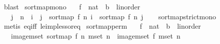 \begin{isabellebody}
\ blast\isanewline
{}\isamarkupfalse%
%
\endisatagproof
{\isafoldproof}%
%
\isadelimproof
\isanewline
%
\endisadelimproof
\isanewline
{}\isamarkupfalse%
\ sort{\isacharunderscore}{\kern0pt}map{\isacharunderscore}{\kern0pt}mono{\isacharcolon}{\kern0pt}\isanewline
\ \ \ f\ {\isacharcolon}{\kern0pt}{\isacharcolon}{\kern0pt}\ {\isachardoublequoteopen}nat\ {\isasymRightarrow}\ {\isacharprime}{\kern0pt}b\ {\isacharcolon}{\kern0pt}{\isacharcolon}{\kern0pt}\ linorder{\isachardoublequoteclose}\isanewline
\ \ \ {\isachardoublequoteopen}j\ {\isacharless}{\kern0pt}\ n\ {\isasymLongrightarrow}\ i\ {\isasymle}\ j\ {\isasymLongrightarrow}\ sort{\isacharunderscore}{\kern0pt}map\ f\ n\ i\ {\isasymle}\ sort{\isacharunderscore}{\kern0pt}map\ f\ n\ j{\isachardoublequoteclose}\isanewline
%
\isadelimproof
\ \ %
\endisadelimproof
%
\isatagproof
{}\isamarkupfalse%
\ sort{\isacharunderscore}{\kern0pt}map{\isacharunderscore}{\kern0pt}strict{\isacharunderscore}{\kern0pt}mono\ \isanewline
\ \ \isamarkupfalse%
\ {\isacharparenleft}{\kern0pt}metis\ eq{\isacharunderscore}{\kern0pt}iff\ le{\isacharunderscore}{\kern0pt}imp{\isacharunderscore}{\kern0pt}less{\isacharunderscore}{\kern0pt}or{\isacharunderscore}{\kern0pt}eq{\isacharparenright}{\kern0pt}%
\endisatagproof
{\isafoldproof}%
%
\isadelimproof
\isanewline
%
\endisadelimproof
\isanewline
{}\isamarkupfalse%
\ sort{\isacharunderscore}{\kern0pt}map{\isacharunderscore}{\kern0pt}perm{\isacharcolon}{\kern0pt}\isanewline
\ \ \ f\ {\isacharcolon}{\kern0pt}{\isacharcolon}{\kern0pt}\ {\isachardoublequoteopen}nat\ {\isasymRightarrow}\ {\isacharprime}{\kern0pt}b\ {\isacharcolon}{\kern0pt}{\isacharcolon}{\kern0pt}\ linorder{\isachardoublequoteclose}\isanewline
\ \ \ {\isachardoublequoteopen}image{\isacharunderscore}{\kern0pt}mset\ {\isacharparenleft}{\kern0pt}sort{\isacharunderscore}{\kern0pt}map\ f\ n{\isacharparenright}{\kern0pt}\ {\isacharparenleft}{\kern0pt}mset\ {\isacharbrackleft}{\kern0pt}{}{\isachardot}{\kern0pt}{\isachardot}{\kern0pt}{\isacharless}{\kern0pt}n{\isacharbrackright}{\kern0pt}{\isacharparenright}{\kern0pt}\ {\isacharequal}{\kern0pt}\ image{\isacharunderscore}{\kern0pt}mset\ f\ {\isacharparenleft}{\kern0pt}mset\ {\isacharbrackleft}{\kern0pt}{}{\isachardot}{\kern0pt}{\isachardot}{\kern0pt}{\isacharless}{\kern0pt}n{\isacharbrackright}{\kern0pt}{\isacharparenright}{\kern0pt}{\isachardoublequoteclose}\isanewline
%
\isadelimproof
%
\endisadelimproof
%
\isatagproof

\end{isabellebody}
